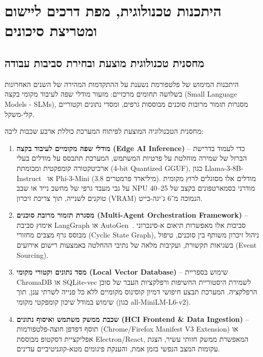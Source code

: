 \chapter{היתכנות טכנולוגית, מפת דרכים ליישום ומטריצת סיכונים}
\label{chap:implementation_roadmap}

\section{מחסנית טכנולוגית מוצעת ובחירת סביבות עבודה}
\label{sec:impl_tech_stack_selection}
היתכנות המימוש של פלטפורמת \projectname{} נשענת על ההתקדמות המהירה של השנים האחרונות בשלושה תחומים מרכזיים: מזעור מודלי שפה לעיבוד מקומי בקצה (\textenglish{Small Language Models - SLMs}), מסגרות תזמור מרובות סוכנים מבוססות גרפים, ומסדי נתונים וקטוריים קלי-משקל.

מחסנית הטכנולוגיה המוצעת לפיתוח המערכת כוללת ארבע שכבות ליבה:
\begin{enumerate}
    \item \textbf{מודלי שפה מקומיים לעיבוד בקצה (\textenglish{Edge AI Inference})} --
    כדי לעמוד בדרישת הברזל של שמירה מוחלטת על פרטיות המשתמש, המערכת תתבסס על מודלים בעלי ארכיטקטורה קומפקטית ומכומתת (\textenglish{4-bit Quantized GGUF}), כגון \textenglish{Llama-3-8B-Instruct}~\cite{touvron2023llama} או \textenglish{Phi-3-Mini} (3.8 מיליארד פרמטרים). מודלים אלו מסוגלים לרוץ מקומית על גבי מעבד גרפי של מחשב נייד או שבב \textenglish{NPU} מודרני בסמארטפונים בקצב של 25--40 טוקנים לשנייה, תוך צריכת זיכרון (\textenglish{VRAM}) הנמוכה מ־6 ג'יגה-בייט.
    \item \textbf{מסגרת תזמור מרובת סוכנים (\textenglish{Multi-Agent Orchestration Framework})} --
    אימוץ סביבת \textenglish{LangGraph} או \textenglish{AutoGen}~\cite{wu2023autogen}. סביבות אלו מאפשרות תיאום א-סינכרוני מבוסס גרף מצבים מחזורי (\textenglish{Cyclic State Graph}), ניהול זיכרון משותף בין סוכנים, טיפול בשגיאות תקשורת, ועקיבות מלאה של נתיבי ההחלטה באמצעות רישום אירועים (\textenglish{Event Sourcing}).
    \item \textbf{מסד נתונים וקטורי מקומי (\textenglish{Local Vector Database})} --
    שימוש בספריית \textenglish{ChromaDB} או \textenglish{SQLite-vec} לשמירת היסטוריית החשיפות ורפלקציות העבר של סוכן הרפלקציה. המערכת תבצע חיפושי דמיון קוסינוס מקומיים ללא כל פנייה לשרתי ענן, תוך שימוש במודל שיכון קומפקטי מקומי (כגון \textenglish{all-MiniLM-L6-v2}).
    \item \textbf{שכבת ממשק משתמש ואיסוף נתונים (\textenglish{HCI Frontend \& Data Ingestion})} --
    תוסף דפדפן חוצה-פלטפורמות (\textenglish{Chrome/Firefox Manifest V3 Extension}) או אפליקציית דסקטופ מבוססת \textenglish{Electron/React}, המאפשרת ממשק חזותי עשיר, הצגת עקומות המצב הנפשי בזמן אמת, והענקת פיגומים מטא-קוגניטיביים עדינים.
\end{enumerate}

